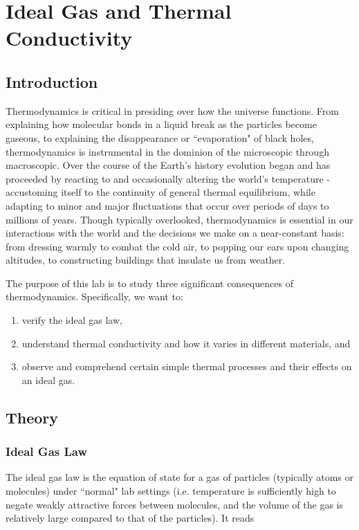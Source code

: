 \chapter{Ideal Gas and Thermal Conductivity}
\label{chap:gas}
\section{Introduction}

Thermodynamics is critical in presiding over how the universe functions.  From explaining how molecular bonds in a liquid break as the particles become gaseous, to explaining the disappearance or ``evaporation" of black holes, thermodynamics is instrumental in the dominion of the microscopic through macroscopic.  Over the course of the Earth's history evolution began and has proceeded by reacting to and occasionally altering the world's temperature - accustoming itself to the continuity of general thermal equilibrium, while adapting to minor and major fluctuations that occur over periods of days to millions of years.  Though typically overlooked, thermodynamics is essential in our interactions with the world and the decisions we make on a near-constant basis: from dressing warmly to combat the cold air, to popping our ears upon changing altitudes, to constructing buildings that insulate us from weather.\myskip

The purpose of this lab is to study three significant consequences of thermodynamics.  Specifically, we want to:
\begin{enumerate}
\item verify the ideal gas law,
\item understand thermal conductivity and how it varies in different materials, and
\item observe and comprehend certain simple thermal processes and their effects on an ideal gas.
\end{enumerate}

\section{Theory}
\label{thermtheory}
\subsection{Ideal Gas Law}
\label{idealtheory}
The ideal gas law is the equation of state for a gas of particles (typically atoms or molecules) under ``normal" lab settings (i.e. temperature is sufficiently high to negate weakly attractive forces between molecules, and the volume of the gas is relatively large compared to that of the particles).  It reads

